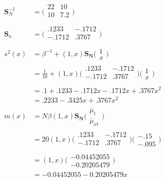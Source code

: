 \documentclass[11pt]{article}
\begin{document}
\begin{align*}
        \boldsymbol S_N^{-1} &= \big( \begin{array}{cc}
                              22 & 10\\
                              10 & 7.2\\
                              \end{array}\big) \\
        \boldsymbol S_n      &= \big( \begin{array}{cc}
                            .1233 & -.1712\\
                            -.1712 & .3767\\
                            \end{array} \big)\\
        s^2(x) &= \beta^{-1} + (1,x) \boldsymbol{S_{N}} \big( \begin{array}{c} 1 \\ x \end{array}\big)\\
               &= \frac{1}{10} + (1, x) \big( \begin{array}{cc}
                            .1233 & -.1712\\
                            -.1712 & .3767\\
                            \end{array} \big) \big( \begin{array}{c} 1 \\ x \end{array} \big)\\
               &= .1 + .1233 - .1712 x - .1712 x + .3767x^2 \\
               &= .2233 - .3425 x + .3767 x^2\\
       m(x)    &= N \beta (1, x) \boldsymbol{S_N} \big( \begin{array}{c} \bar \mu_t \\ \bar \mu_{xt} \end{array} \big)\\
               &= 20  (1, x) \big( \begin{array}{cc}
                            .1233 & -.1712\\
                            -.1712 & .3767\\
                            \end{array} \big) \big( \begin{array}{c} -.15 \\ -.095 \end{array} \big)\\
               &= (1,x) \big( \begin{array}{c} -0.04452055\\-0.20205479 \end{array}\big)\\
               &=  -0.04452055  -0.20205479 x \\
        \end{align*}
\end{document}
